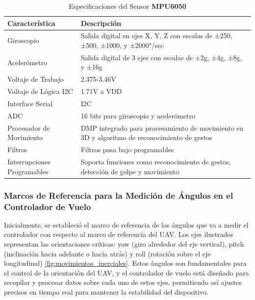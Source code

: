         \begin{table}[H]
            \centering
            \caption{Especificaciones del Sensor \textbf{MPU6050}}
            \label{tab:mpu6050_specs}
            \begin{tabular}{|l|l|}
                \hline
                \textbf{Característica} & \textbf{Descripción} \\ \hline
                Giroscopio & Salida digital en ejes X, Y, Z con escalas de ±250, ±500, ±1000, y ±2000°/sec \\ \hline
                Acelerómetro & Salida digital de 3 ejes con escalas de ±2g, ±4g, ±8g, y ±16g \\ \hline
                Voltaje de Trabajo & 2.375-3.46V \\ \hline
                Voltaje de Lógica I2C & 1.71V a VDD \\ \hline
                Interface Serial & I2C \\ \hline
                ADC & 16 bits para giroscopio y acelerómetro \\ \hline
                Procesador de Movimiento & DMP integrado para procesamiento de movimiento en 3D y algoritmo de reconocimiento de gestos \\ \hline
                Filtros & Filtros pasa bajo programables \\ \hline
                Interrupciones Programables & Soporta funciones como reconocimiento de gestos, detección de golpe y movimiento \\ \hline
            \end{tabular}
        \end{table}


    \subsubsection{  Marcos de Referencia para la Medición de Ángulos en el Controlador de Vuelo} 
        Inicialmente, se estableció el marco de referencia de los ángulos que va a medir el controlador con respecto al marco de referencia del UAV. Los ejes ilustrados representan las orientaciones críticas: yaw (giro alrededor del eje vertical), pitch (inclinación hacia adelante o hacia atrás) y roll (rotación sobre el eje longitudinal) \ref{fig:movimientos_inerciales}. Estos ángulos son fundamentales para el control de la orientación del UAV, y el controlador de vuelo está diseñado para recopilar y procesar datos sobre cada uno de estos ejes, permitiendo así ajustes precisos en tiempo real para mantener la estabilidad del dispositivo.

